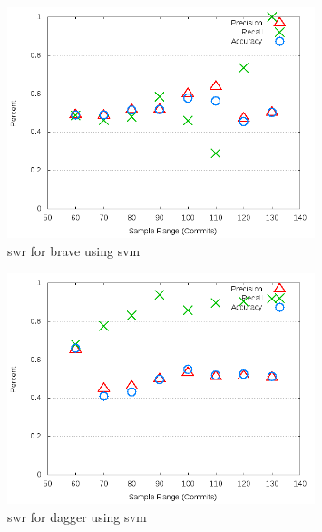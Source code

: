 \begin{figure}[!t]
\centering
\includegraphics[width=0.8\textwidth]{images/svm/test_1/brave_sample_range.png}
\caption{\gls{swr} for brave using \gls{svm}}
\label{fig:test_1_brave_svm}
\end{figure}

\begin{figure}[!t]
\centering
\includegraphics[width=0.8\textwidth]{images/svm/test_1/dagger_sample_range.png}
\caption{\gls{swr} for dagger using \gls{svm}}
\label{fig:test_1_dagger_svm}
\end{figure}

